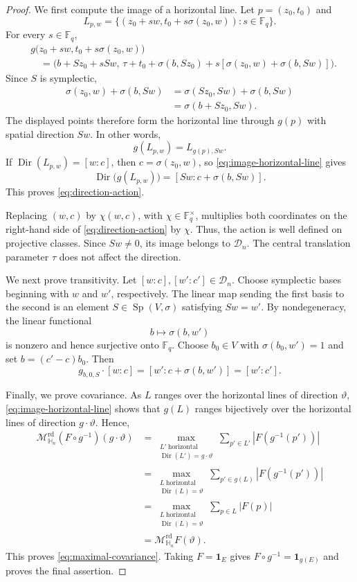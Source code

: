 \documentclass[11pt,letterpaper]{amsart}
\numberwithin{equation}{section}
\theoremstyle{definition}
\theoremstyle{remark}
\newcommand{\Fq}{\mathbb F_q}
\newcommand{\HH}{\mathbb H}
\newcommand{\Dn}{\mathcal D_n}
\newcommand{\Mrd}{\mathcal M^{\mathrm{rd}}_{\HH_n}}
\newcommand{\one}{\mathbf 1}
\newcommand{\Dir}{\operatorname{Dir}}
\newcommand{\Sp}{\operatorname{Sp}}
\begin{document}
\begin{proof}
We first compute the image of a horizontal line. Let
$p=(z_0,t_0)$ and
\[
 L_{p,w}
 =
 \{(z_0+sw,t_0+s\sigma(z_0,w)):s\in\Fq\}.
\]
For every $s\in\Fq$,
\begin{align*}
 &g\bigl(z_0+sw,t_0+s\sigma(z_0,w)\bigr)\\
 &\quad=
 \bigl(
 b+Sz_0+sSw,\,
 \tau+t_0+\sigma(b,Sz_0)
 +s[\sigma(z_0,w)+\sigma(b,Sw)]
 \bigr).
\end{align*}
Since $S$ is symplectic,
\begin{align*}
 \sigma(z_0,w)+\sigma(b,Sw)
 &=
 \sigma(Sz_0,Sw)+\sigma(b,Sw)\\
 &=
 \sigma(b+Sz_0,Sw).
\end{align*}
The displayed points therefore form the horizontal line through
$g(p)$ with spatial direction $Sw$. In other words,
\begin{equation}\label{eq:image-horizontal-line}
 g(L_{p,w})=L_{g(p),Sw}.
\end{equation}
If $\Dir(L_{p,w})=[w:c]$, then $c=\sigma(z_0,w)$, so
\eqref{eq:image-horizontal-line} gives
\[
 \Dir\bigl(g(L_{p,w})\bigr)
 =
 [Sw:c+\sigma(b,Sw)].
\]
This proves \eqref{eq:direction-action}.

Replacing $(w,c)$ by $\chi(w,c)$, with $\chi\in\Fq^\times$, multiplies
both coordinates on the right-hand side of \eqref{eq:direction-action} by $\chi$. Thus, the action is well defined on projective classes. Since $Sw\neq0$, its image belongs to $\Dn$.
The central translation parameter $\tau$ does not affect the direction.

We next prove transitivity.  Let $[w:c],[w':c']\in\Dn$. Choose
symplectic bases beginning with $w$ and $w'$, respectively. The linear
map sending the first basis to the second is an element
$S\in\Sp(V,\sigma)$ satisfying $Sw=w'$. By nondegeneracy, the linear functional
\[
 b\longmapsto\sigma(b,w')
\]
is nonzero and hence surjective onto $\Fq$. Choose $b_0\in V$ with
$\sigma(b_0,w')=1$ and set $b=(c'-c)b_0$. Then
\[
 g_{b,0,S}\cdot[w:c]
 =
 [w':c+\sigma(b,w')]
 =
 [w':c'].
\]

Finally, we prove covariance. As $L$ ranges over the horizontal lines
of direction $\vartheta$, \eqref{eq:image-horizontal-line} shows that $g(L)$ ranges bijectively over the horizontal lines of direction
$g\cdot\vartheta$. Hence,
\begin{align*}
 \Mrd(F\circ g^{-1})(g\cdot\vartheta)
 &=
 \max_{\substack{L'\ \mathrm{horizontal}\\
                  \Dir(L')=g\cdot\vartheta}}
 \sum_{p'\in L'}|F(g^{-1}(p'))|\\
 &=
 \max_{\substack{L\ \mathrm{horizontal}\\
                  \Dir(L)=\vartheta}}
 \sum_{p'\in g(L)}|F(g^{-1}(p'))|\\
 &=
 \max_{\substack{L\ \mathrm{horizontal}\\
                  \Dir(L)=\vartheta}}
 \sum_{p\in L}|F(p)|\\
 &=
 \Mrd F(\vartheta).
\end{align*}
This proves \eqref{eq:maximal-covariance}. Taking $F=\one_E$ gives
$F\circ g^{-1}=\one_{g(E)}$ and proves the final assertion.
\end{proof}
\end{document}
